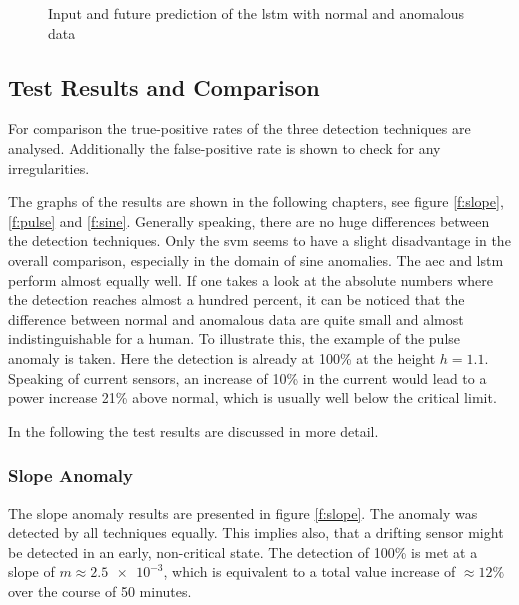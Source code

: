	\begin{figure}[htb]
	\centering
	\begin{minipage}[t]{0.45\textwidth}
			
	\end{minipage}
	\begin{minipage}[t]{0.45\textwidth}
			
	\end{minipage}
	\caption{Input and future prediction of the \ac{lstm} with normal and anomalous data}
	\label{f:lstm_deep}
	\end{figure}	
	
	\subsection{Test Results and Comparison}
	For comparison the 	true-positive rates of the three detection techniques are analysed. Additionally the false-positive rate is shown to check for any irregularities. 

	The graphs of the results are shown in the following chapters, see figure \ref{f:slope}, \ref{f:pulse} and \ref{f:sine}. Generally speaking, there are no huge differences between the detection techniques. Only the \ac{svm} seems to have a slight disadvantage in the overall comparison, especially in the domain of sine anomalies. The \ac{aec} and \ac{lstm} perform almost equally well. \newline %
	If one takes a look at the absolute numbers where the detection reaches almost a hundred percent, it can be noticed that the difference between normal and anomalous data are quite small and almost indistinguishable for a human. To illustrate this, the example of the pulse anomaly is taken. Here the detection is already at 100\% at the height $h=1.1$. Speaking of current sensors, an increase of 10\% in the current would lead to a power increase 21\% above normal, which is usually well below the critical limit.
	
	In the following the test results are discussed in more detail.	
	
	\subsubsection{Slope Anomaly}
	The slope anomaly results are presented in figure \ref{f:slope}. The anomaly was detected by all techniques equally. This implies also, that a drifting sensor might be detected in an early, non-critical state. \newline
	The detection of 100\% is met at a slope of $m \approx \num{2.5e-3}$, which is equivalent to a total value increase of $\approx 12\%$ over the course of 50 minutes.
	
